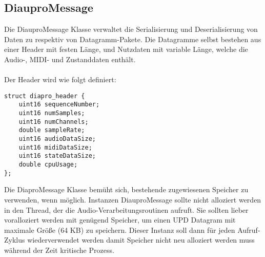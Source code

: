 \subsection{DiauproMessage}

Die DiauproMessage Klasse verwaltet die Serialisierung und Deserialisierung von Daten zu respektiv von Datagramm-Pakete. Die Datagramme selbst bestehen aus einer Header mit festen Länge, und Nutzdaten mit variable Länge, welche die Audio-, MIDI- und Zustanddaten enthält.\\
\\
Der Header wird wie folgt definiert:

\begin{lstlisting}
struct diapro_header {
    uint16 sequenceNumber;
    uint16 numSamples;
    uint16 numChannels;
    double sampleRate;
    uint16 audioDataSize;
    uint16 midiDataSize;
    uint16 stateDataSize;
    double cpuUsage;
};
\end{lstlisting}

Die DiaproMessage Klasse bemüht sich, bestehende zugewiesenen Speicher zu verwenden, wenn möglich. Instanzen DiauproMessage sollte nicht alloziert werden in den Thread, der die Audio-Verarbeitungsroutinen aufruft. Sie sollten lieber voralloziert werden mit genügend Speicher, um einen UPD Datagram mit maximale Größe (64 KB) zu speichern. Dieser Instanz soll dann für jeden Aufruf-Zyklus wiederverwendet werden damit Speicher nicht neu alloziert werden muss während der Zeit kritische Prozess.
